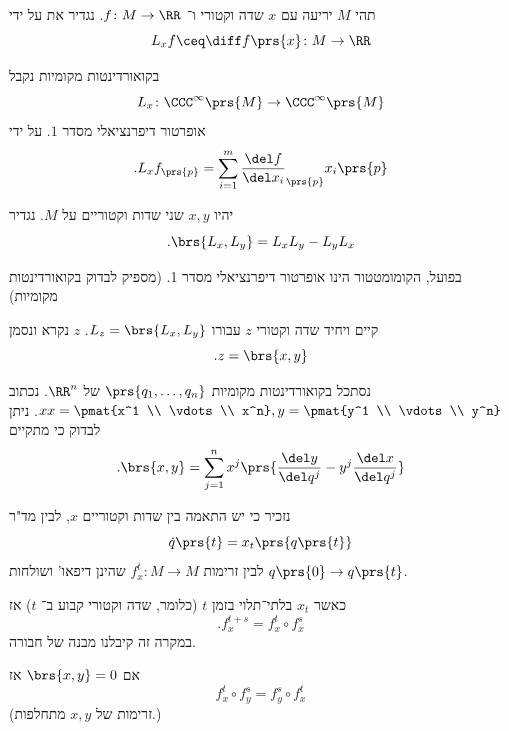 \documentclass[a4paper,10pt,twoside,openany]{book}
\begin{document}
\begin{definition}
תהי
$M$
יריעה עם
$x$
שדה וקטורי ו־%
$f \colon M \to \RR$.
נגדיר את
על ידי
\[L_x f \ceq \diff f\prs{x} \colon M \to \RR\]
\end{definition}
\begin{remark}
בקואורדינטות מקומיות נקבל
\[L_x \colon \CCC^{\infty}\prs{M} \to \CCC^{\infty}\prs{M}\]
אופרטור דיפרנציאלי מסדר
$1$.
על ידי
\[\text{.} L_x f_{\prs{p}} = \sum_{i=1}^m \frac{\del f}{\del x_i}_{\prs{p}} x_i \prs{p}\]
\end{remark}

\begin{definition}
יהיו
$x,y$
שני שדות וקטוריים על
$M$.
נגדיר
\[\text{.} \brs{L_x, L_y} = L_x L_y - L_y L_x\]
\end{definition}
\begin{exercise}
בפועל, הקומומטטור הינו אופרטור דיפרנציאלי מסדר 1. (מספיק לבדוק בקואורדינטות מקומיות)
\end{exercise}
\begin{exercise}
קיים ויחיד שדה וקטורי
$z$
עבורו
$L_z = \brs{L_x, L_y}$.
$z$
נקרא
ונסמן
\[\text{.} z = \brs{x,y}\]
\end{exercise}
\begin{remark}
נסתכל בקואורדינטות מקומיות
$\prs{q_1, \ldots, q_n}$
של
$\RR^n$.
נכתוב
$xx = \pmat{x^1 \\ \vdots \\ x^n}, y = \pmat{y^1 \\ \vdots \\ y^n}$.
ניתן לבדוק כי מתקיים
\[\text{.} \brs{x,y} = \sum_{j=1}^n x^j \prs{\frac{\del y}{\del q^j} - y^j \frac{\del x}{\del q^j}}\]
\end{remark}

נזכיר כי יש התאמה בין שדות וקטוריים
$x$,
לבין מד"ר
\[\dot{q}\prs{t} = x_t\prs{q\prs{t}}\]
לבין זרימות
$f^t_x \colon M \to M$
שהינן דיפאו' ושולחות
$q\prs{0} \to q\prs{t}$.

כאשר
$x_t$
בלתי־תלוי בזמן
$t$ (כלומר, שדה וקטורי קבוע ב־%
$t$)
אז
\[\text{.} f_x^{t+s} = f_x^t \circ f_x^s\]
במקרה זה קיבלנו מבנה של חבורה.

\begin{exercise}
אם
$\brs{x,y} = 0$
אז
\[f_x^t \circ f_y^s = f_y^s \circ f_x^t\]
(זרימות של
$x,y$ מתחלפות.)
\end{exercise}

\backmatter
\end{document}
